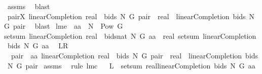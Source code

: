 \begin{isabellebody}
\ assms\ \isamarkupfalse%
\ blast\ \isacommand{{\isacharbraceright}}\isamarkupfalse%
\isanewline
\ \ \isamarkupfalse%
\ {\isachardoublequoteopen}{\isasymforall}pair{\isasymin}X{\isachardot}\ linearCompletion{\isacharprime}\ {\isacharparenleft}real\ {\isasymcirc}\ bids{\isacharparenright}\ N\ G\ pair\ {\isacharequal}\ {\isacharparenleft}real\ {\isasymcirc}\ linearCompletion{\isacharprime}\ bids\ N\ G{\isacharparenright}\ pair{\isachardoublequoteclose}\ \isamarkupfalse%
\ blast\isanewline
{}\isamarkupfalse%
%
\endisatagproof
{\isafoldproof}%
%
\isadelimproof
\isanewline
%
\endisadelimproof
\isanewline
{}\isamarkupfalse%
\ lm{}{}{}e{\isacharcolon}\ \ {\isachardoublequoteopen}aa\ {\isasymsubseteq}\ N\ {\isasymtimes}\ {\isacharparenleft}Pow\ G{\isacharminus}{\isacharbraceleft}{\isacharbraceleft}{\isacharbraceright}{\isacharbraceright}{\isacharparenright}{\isachardoublequoteclose}\ \isanewline
{\isachardoublequoteopen}setsum\ {\isacharparenleft}{\isacharparenleft}linearCompletion{\isacharprime}\ {\isacharparenleft}real\ {\isasymcirc}\ {\isacharparenleft}bids{\isacharcolon}{\isacharcolon}{\isacharunderscore}{\isacharequal}{\isachargreater}nat{\isacharparenright}{\isacharparenright}\ N\ G{\isacharparenright}{\isacharparenright}\ aa\ {\isacharequal}\ real\ {\isacharparenleft}setsum\ {\isacharparenleft}{\isacharparenleft}linearCompletion{\isacharprime}\ bids\ N\ G{\isacharparenright}{\isacharparenright}\ aa{\isacharparenright}{\isachardoublequoteclose}\ \isanewline
{\isacharparenleft}\ {\isachardoublequoteopen}{\isacharquery}L{\isacharequal}{\isacharquery}R{\isachardoublequoteclose}{\isacharparenright}\isanewline
%
\isadelimproof
%
\endisadelimproof
%
\isatagproof
{}\isamarkupfalse%
\ {\isacharminus}\isanewline
{}\isamarkupfalse%
\ {\isachardoublequoteopen}{\isasymforall}\ pair\ {\isasymin}\ aa{\isachardot}\ linearCompletion{\isacharprime}\ {\isacharparenleft}real\ {\isasymcirc}\ bids{\isacharparenright}\ N\ G\ pair\ {\isacharequal}\ {\isacharparenleft}real\ {\isasymcirc}\ {\isacharparenleft}linearCompletion{\isacharprime}\ bids\ N\ G{\isacharparenright}{\isacharparenright}\ pair{\isachardoublequoteclose}\isanewline
{}\isamarkupfalse%
\ assms\ \isamarkupfalse%
\ {\isacharparenleft}rule\ lm{}{}{}c{\isacharparenright}\isanewline
{}\isamarkupfalse%
\ \isamarkupfalse%
\ {\isachardoublequoteopen}{\isacharquery}L\ {\isacharequal}\ setsum\ {\isacharparenleft}real{\isasymcirc}{\isacharparenleft}linearCompletion{\isacharprime}\ bids\ N\ G{\isacharparenright}{\isacharparenright}\ aa{\isachardoublequoteclose}\ \isamarkupfalse%

\end{isabellebody}
